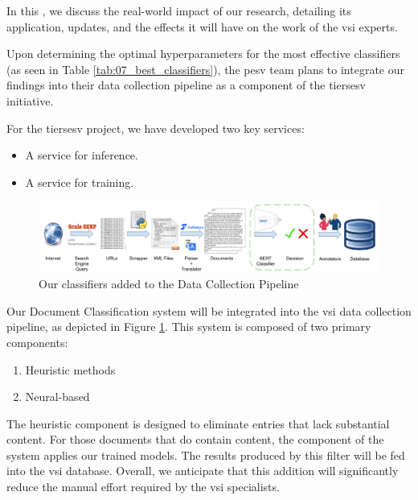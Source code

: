 \label{08_practical_implications}


In this \headerName{}, we discuss the real-world impact of our research, detailing its application, updates, and the effects it will have on the work of the \gls{vsi} experts.

\label{08_overview}


Upon determining the optimal hyperparameters for the most effective classifiers (as seen in Table \ref{tab:07_best_classifiers}), the \gls{pesv} team plans to integrate our findings into their data collection pipeline as a component of the \gls{tiersesv} initiative.

For the \gls{tiersesv} project, we have developed two key services:
\begin{itemize}
\item A service for inference.
\item A service for training.
\end{itemize}



\label{08_inference_service}


\begin{figure}[h]
    \centering
    \includegraphics[width=\textwidth]{Figures/08/08_vsi_dataset_collection_with_classifier.png}
    \caption{Our classifiers added to the \VSI{} Data Collection Pipeline}
    \label{fig:08_vsi_data_collection_pipeline_with_classifier}
\end{figure}

Our Document Classification system will be integrated into the \gls{vsi} data collection pipeline, as depicted in Figure \ref{fig:08_vsi_data_collection_pipeline_with_classifier}. This system is composed of two primary components:
\begin{enumerate}
\item Heuristic methods
\item Neural-based \textclassification{}
\end{enumerate}

The heuristic component is designed to eliminate entries that lack substantial content. For those documents that do contain content, the \textclassification{} component of the system applies our trained models.
The results produced by this filter will be fed into the \gls{vsi} database. Overall, we anticipate that this addition will significantly reduce the manual effort required by the \gls{vsi} specialists.

